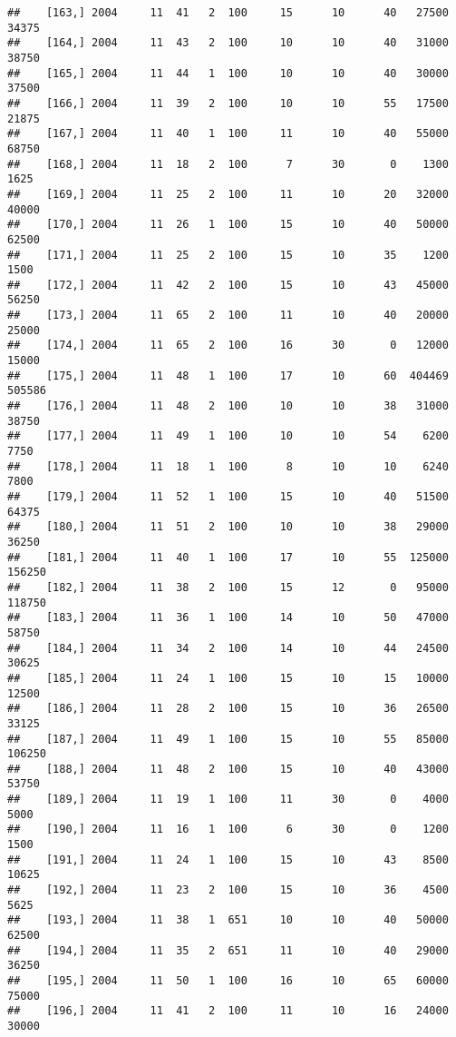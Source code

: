 \documentclass{article}\usepackage[]{graphicx}\usepackage[]{color}
\makeatletter
\newenvironment{kframe}{%
 \def\at@end@of@kframe{}%
 \ifinner\ifhmode%
  \def\at@end@of@kframe{\end{minipage}}%
  \begin{minipage}{\columnwidth}%
 \fi\fi%
 \def\FrameCommand##1{\hskip\@totalleftmargin \hskip-\fboxsep
 \colorbox{shadecolor}{##1}\hskip-\fboxsep
     \hskip-\linewidth \hskip-\@totalleftmargin \hskip\columnwidth}%
 \MakeFramed {\advance\hsize-\width
   \@totalleftmargin\z@ \linewidth\hsize
   \@setminipage}}%
 {\par\unskip\endMakeFramed%
 \at@end@of@kframe}
\newenvironment{knitrout}{}{} %
\makeatother
\begin{document}
\begin{knitrout}
\begin{kframe}
\begin{verbatim}
##    [163,] 2004     11  41   2  100     15      10      40   27500   34375
##    [164,] 2004     11  43   2  100     10      10      40   31000   38750
##    [165,] 2004     11  44   1  100     10      10      40   30000   37500
##    [166,] 2004     11  39   2  100     10      10      55   17500   21875
##    [167,] 2004     11  40   1  100     11      10      40   55000   68750
##    [168,] 2004     11  18   2  100      7      30       0    1300    1625
##    [169,] 2004     11  25   2  100     11      10      20   32000   40000
##    [170,] 2004     11  26   1  100     15      10      40   50000   62500
##    [171,] 2004     11  25   2  100     15      10      35    1200    1500
##    [172,] 2004     11  42   2  100     15      10      43   45000   56250
##    [173,] 2004     11  65   2  100     11      10      40   20000   25000
##    [174,] 2004     11  65   2  100     16      30       0   12000   15000
##    [175,] 2004     11  48   1  100     17      10      60  404469  505586
##    [176,] 2004     11  48   2  100     10      10      38   31000   38750
##    [177,] 2004     11  49   1  100     10      10      54    6200    7750
##    [178,] 2004     11  18   1  100      8      10      10    6240    7800
##    [179,] 2004     11  52   1  100     15      10      40   51500   64375
##    [180,] 2004     11  51   2  100     10      10      38   29000   36250
##    [181,] 2004     11  40   1  100     17      10      55  125000  156250
##    [182,] 2004     11  38   2  100     15      12       0   95000  118750
##    [183,] 2004     11  36   1  100     14      10      50   47000   58750
##    [184,] 2004     11  34   2  100     14      10      44   24500   30625
##    [185,] 2004     11  24   1  100     15      10      15   10000   12500
##    [186,] 2004     11  28   2  100     15      10      36   26500   33125
##    [187,] 2004     11  49   1  100     15      10      55   85000  106250
##    [188,] 2004     11  48   2  100     15      10      40   43000   53750
##    [189,] 2004     11  19   1  100     11      30       0    4000    5000
##    [190,] 2004     11  16   1  100      6      30       0    1200    1500
##    [191,] 2004     11  24   1  100     15      10      43    8500   10625
##    [192,] 2004     11  23   2  100     15      10      36    4500    5625
##    [193,] 2004     11  38   1  651     10      10      40   50000   62500
##    [194,] 2004     11  35   2  651     11      10      40   29000   36250
##    [195,] 2004     11  50   1  100     16      10      65   60000   75000
##    [196,] 2004     11  41   2  100     11      10      16   24000   30000

\end{verbatim}
\end{kframe}
\end{knitrout}
\end{document}
